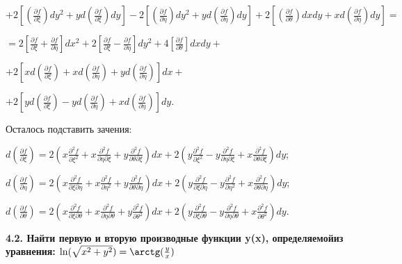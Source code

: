 \documentclass{article}
\begin{document}
\noindent$+ 2[(\frac{\partial f}{\partial \xi})dy^2 + yd(\frac{\partial f}{\partial \xi})dy] - 2[(\frac{\partial f}{\partial \eta})dy^2 + yd(\frac{\partial f}{\partial \eta})dy] + 2[(\frac{\partial f}{\partial \theta})dxdy + xd(\frac{\partial f}{\partial \eta})dy]=$\vspace{1mm}

\noindent$=2[\frac{\partial f}{\partial \xi} + \frac{\partial f}{\partial \eta}]dx^2 + 2[\frac{\partial f}{\partial \xi} - \frac{\partial f}{\partial \eta}]dy^2 + 4[\frac{\partial f}{\partial \theta}]dxdy+$\vspace{1mm}

\noindent$+ 2[xd(\frac{\partial f}{\partial \xi})+xd(\frac{\partial f}{\partial \eta})+yd(\frac{\partial f}{\partial \eta})]dx + $ \vspace{1mm}

\noindent$+ 2[yd(\frac{\partial f}{\partial \xi})-yd(\frac{\partial f}{\partial \eta})+xd(\frac{\partial f}{\partial \eta})]dy$.\vspace{3mm}

\noindent Осталось подставить зачения:\vspace{1mm}

\noindent$d(\frac{\partial f}{\partial \xi}) =  2(x\frac{\partial^2 f}{\partial \xi^2} + x\frac{\partial^2 f}{\partial \eta \partial \xi} + y \frac{\partial^2 f}{\partial \theta \partial \xi})dx + 2(y\frac{\partial^2 f}{\partial \xi^2} - y\frac{\partial^2 f}{\partial \eta \partial \xi} + x\frac{\partial^2 f}{\partial \theta \partial \xi} )dy$;\vspace{1mm}

\noindent$d(\frac{\partial f}{\partial \eta}) =  2(x\frac{\partial^2 f}{\partial \xi \partial \eta} + x\frac{\partial^2 f}{\partial \eta^2} + y \frac{\partial^2 f}{\partial \theta \partial \eta})dx + 2(y\frac{\partial^2 f}{\partial \xi \partial \eta} - y\frac{\partial^2 f}{\partial \eta^2} + x\frac{\partial^2 f}{\partial \theta \partial \eta} )dy$;\vspace{1mm}

\noindent$d(\frac{\partial f}{\partial \theta}) =  2(x\frac{\partial^2 f}{\partial \xi \partial \theta} + x\frac{\partial^2 f}{\partial \eta \partial \theta} + y \frac{\partial^2 f}{\partial \theta^2})dx + 2(y\frac{\partial^2 f}{\partial \xi \partial \theta} - y\frac{\partial^2 f}{\partial \eta \partial \theta} + x\frac{\partial^2 f}{\partial \theta^2} )dy$.\vspace{3mm}

\noindent \textbf{4.2. Найти первую и вторую производные функции y(x), определяемойиз уравнения: $\ln(\sqrt{x^2+y^2}) = \arctg(\frac{y}{x})$}\vspace{1mm}
\end{document}
